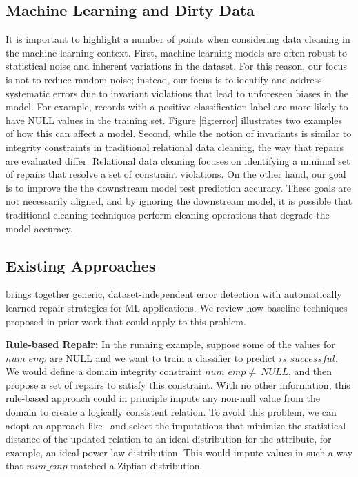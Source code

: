 \subsection{Machine Learning and Dirty Data}
It is important to highlight a number of points when considering data cleaning in the machine learning context.
First, machine learning models are often robust to statistical noise and inherent variations in the dataset.  For this reason, our focus is not to reduce random noise; instead, our focus is to identify and address systematic errors due to invariant violations that lead to unforeseen biases in the model.  
For example, records with a positive classification label are more likely to have NULL values in the training set.
Figure \ref{fig:error} illustrates two examples of how this can affect a model.
Second, while the notion of invariants is similar to integrity constraints in traditional relational data cleaning, the way that repairs are evaluated differ.  Relational data cleaning focuses on identifying a minimal set of repairs that resolve a set of constraint violations.  On the other hand, our goal is to improve the the downstream model test prediction accuracy.  These goals are not necessarily aligned, and by ignoring the downstream model, it is possible that traditional cleaning techniques perform cleaning operations that degrade the model accuracy.

\subsection{Existing Approaches}
\sys brings together generic, dataset-independent error detection with automatically learned repair strategies for ML applications.
We review how baseline techniques proposed in prior work that could apply to this problem.

\vspace{0.5em}

\noindent\textbf{Rule-based Repair: } 
In the running example, suppose some of the values for $num\_emp$ are NULL and we want to train a classifier to predict $is\_successful$.
We would define a domain integrity constraint $num\_emp \ne~NULL$, and then propose a set of repairs to satisfy this constraint.
With no other information, this rule-based approach could in principle impute any non-null value from the domain to create a logically consistent relation.
To avoid this problem, we can adopt an approach like~\cite{prokoshyna2015combining} and select the imputations that minimize the statistical distance of the updated relation to an ideal distribution for the attribute, for example, an ideal power-law distribution.
This would impute values in such a way that $num\_emp$ matched a Zipfian distribution.

